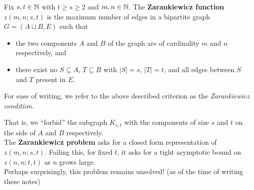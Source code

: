 		\begin{fdef}
			Fix $s, t \in \mathbb{N}$ with $t \ge s \ge 2$ and $m,n\in\mathbb{N}$.
			The \textbf{Zarankiewicz function} $z(m,n;s,t)$ is the maximum number of edges in a bipartite graph $G = (A \sqcup B, E)$ such that
			\begin{itemize}
				\item the two components $A$ and $B$ of the graph are of cardinality $m$ and $n$ respectively\footnotemark, and
				\item there exist no $S \subseteq A$, $T \subseteq B$ with $|S|=s$, $|T|=t$, and all edges between $S$ and $T$ present in $E$.\footnotemark
			\end{itemize}
		\end{fdef}

		For ease of writing, we refer to the above described criterion as the \emph{Zarankiewicz condition}.

		That is, we ``forbid'' the subgraph $K_{s,t}$ with the components of size $s$ and $t$ on the side of $A$ and $B$ respectively.\\

		The \textbf{Zarankiewicz problem} asks for a closed form representation of $z(m,n;s,t)$. Failing this, for fixed $t$, it asks for a tight asymptotic bound on $z(n,n;t,t)$ as $n$ grows large.\\
		Perhaps surprisingly, this problem remains unsolved! (as of the time of writing these notes)

